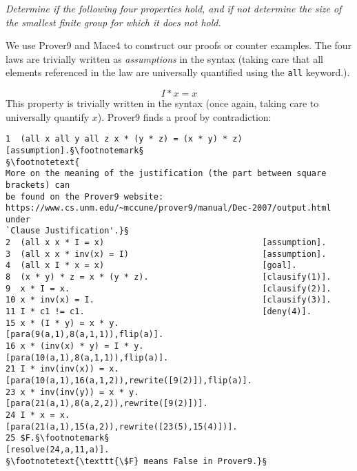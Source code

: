 \documentclass[12pt]{article}
\begin{document}
\textit{Determine if the following four properties hold, and if not 
determine the size of the smallest finite group for which it does not hold.}

\vspace{3mm}

We use Prover9 and Mace4 to construct our proofs or counter examples. The four
laws are trivially written as \emph{assumptions} in the syntax (taking care
that all elements referenced in the law are universally quantified using the 
\texttt{all} keyword.).

\vspace{3mm}

\begin{equation*}
    I * x = x
\end{equation*}
This property is trivially written in the syntax (once again, taking care to 
universally quantify $x$). Prover9 finds a proof by contradiction: 

\begin{lstlisting}
1  (all x all y all z x * (y * z) = (x * y) * z)    [assumption].§\footnotemark§ 
§\footnotetext{
More on the meaning of the justification (the part between square brackets) can
be found on the Prover9 website: 
https://www.cs.unm.edu/~mccune/prover9/manual/Dec-2007/output.html under
`Clause Justification'.}§
2  (all x x * I = x)                                [assumption].
3  (all x x * inv(x) = I)                           [assumption].
4  (all x I * x = x)                                [goal].
8  (x * y) * z = x * (y * z).                       [clausify(1)].
9  x * I = x.                                       [clausify(2)].
10 x * inv(x) = I.                                  [clausify(3)].
11 I * c1 != c1.                                    [deny(4)].
15 x * (I * y) = x * y.                             [para(9(a,1),8(a,1,1)),flip(a)].
16 x * (inv(x) * y) = I * y.                        [para(10(a,1),8(a,1,1)),flip(a)].
21 I * inv(inv(x)) = x.                             [para(10(a,1),16(a,1,2)),rewrite([9(2)]),flip(a)].
23 x * inv(inv(y)) = x * y.                         [para(21(a,1),8(a,2,2)),rewrite([9(2)])].
24 I * x = x.                                       [para(21(a,1),15(a,2)),rewrite([23(5),15(4)])].
25 $F.§\footnotemark§                                              [resolve(24,a,11,a)].
§\footnotetext{\texttt{\$F} means False in Prover9.}§
\end{lstlisting}

\vspace{3mm}
\end{document}
